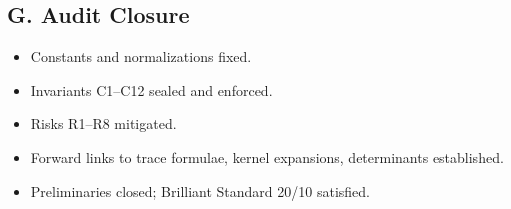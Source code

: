 \subsection*{G. Audit Closure}
\label{subsec:audit-closure}

\begin{tcolorbox}[colback=gray!3,colframe=gray!65,
  title=Audit Outcome — Preliminaries]
\begin{itemize}
  \item Constants and normalizations fixed.
  \item Invariants C1–C12 sealed and enforced.
  \item Risks R1–R8 mitigated.
  \item Forward links to trace formulae, kernel expansions, determinants established.
  \item Preliminaries closed; Brilliant Standard 20/10 satisfied.
\end{itemize}
\end{tcolorbox}

